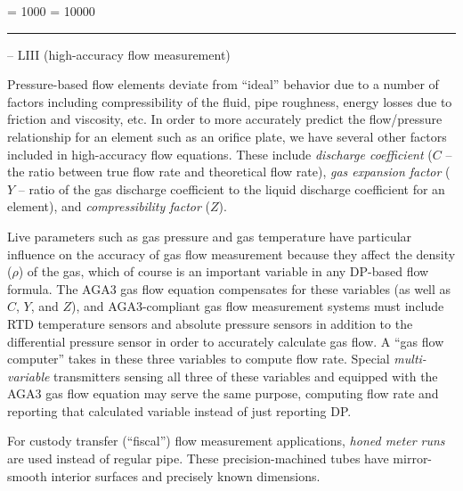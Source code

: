



\tolerance = 1000
\pretolerance = 10000

\vskip 5pt \hrule \vskip 5pt  -- LIII (high-accuracy flow measurement) \vskip 10pt

Pressure-based flow elements deviate from ``ideal'' behavior due to a number of factors including compressibility of the fluid, pipe roughness, energy losses due to friction and viscosity, etc.  In order to more accurately predict the flow/pressure relationship for an element such as an orifice plate, we have several other factors included in high-accuracy flow equations.  These include {\it discharge coefficient} ($C$ -- the ratio between true flow rate and theoretical flow rate), {\it gas expansion factor} ($Y$ -- ratio of the gas discharge coefficient to the liquid discharge coefficient for an element), and {\it compressibility factor} ($Z$).

\vskip 10pt

Live parameters such as gas pressure and gas temperature have particular influence on the accuracy of gas flow measurement because they affect the density ($\rho$) of the gas, which of course is an important variable in any DP-based flow formula.  The AGA3 gas flow equation compensates for these variables (as well as $C$, $Y$, and $Z$), and AGA3-compliant gas flow measurement systems must include RTD temperature sensors and absolute pressure sensors in addition to the differential pressure sensor in order to accurately calculate gas flow.  A ``gas flow computer'' takes in these three variables to compute flow rate.  Special {\it multi-variable} transmitters sensing all three of these variables and equipped with the AGA3 gas flow equation may serve the same purpose, computing flow rate and reporting that calculated variable instead of just reporting DP.

\vskip 10pt

For custody transfer (``fiscal'') flow measurement applications, {\it honed meter runs} are used instead of regular pipe.  These precision-machined tubes have mirror-smooth interior surfaces and precisely known dimensions.

